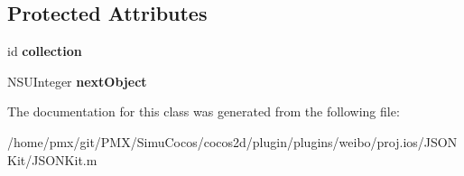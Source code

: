 \subsection*{Protected Attributes}
\begin{DoxyCompactItemize}
\item 
\mbox{\label{interfaceJKDictionaryEnumerator_a58e8ed040636b59b6c9eaeb0dc6c89f2}} 
id {\bfseries collection}
\item 
\mbox{\label{interfaceJKDictionaryEnumerator_add4b08edabce81c31438ec3c16cd37d8}} 
N\+S\+U\+Integer {\bfseries next\+Object}
\end{DoxyCompactItemize}


The documentation for this class was generated from the following file\+:\begin{DoxyCompactItemize}
\item 
/home/pmx/git/\+P\+M\+X/\+Simu\+Cocos/cocos2d/plugin/plugins/weibo/proj.\+ios/\+J\+S\+O\+N\+Kit/J\+S\+O\+N\+Kit.\+m\end{DoxyCompactItemize}
